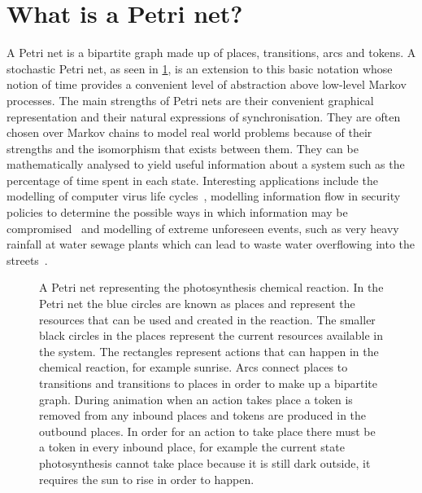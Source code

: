 \section{What is a Petri net?}
A Petri net is a bipartite graph made up of places, transitions, arcs and tokens. A stochastic Petri net, as seen in \cref{tikz:photo}, is an extension to this basic notation whose notion of time provides a convenient level of abstraction above low-level Markov processes. The main strengths of Petri nets are their convenient graphical representation and their natural expressions of synchronisation. They are often chosen over Markov chains to model real world problems because of their strengths and the isomorphism that exists between them. They can be mathematically analysed to yield useful information about a system such as the percentage of time spent in each state. Interesting applications include the modelling of computer virus life cycles~\cite{kotenko2005analyzing}, modelling information flow in security policies to determine the possible ways in which information may be compromised~\cite{varadharajan1990petri} and modelling of extreme unforeseen events, such as very heavy rainfall at water sewage plants which can lead to waste water overflowing into the streets~\cite{ghasemieh2013analysis}.

\begin{figure}[tb]

\caption{A Petri net representing the photosynthesis chemical reaction. In the Petri net the blue circles are known as places and represent the resources that can be used and created in the reaction. The smaller black circles in the places represent the current resources available in the system. The rectangles represent actions that can happen in the chemical reaction, for example sunrise. Arcs connect places to transitions and transitions to places in order to make up a bipartite graph. During animation when an action takes place a token is removed from any inbound places and tokens are produced in the outbound places. In order for an action to take place there must be a token in every inbound place, for example the current state photosynthesis cannot take place because it is still dark outside, it requires the sun to rise in order to happen. }
\label{tikz:photo}
\end{figure}